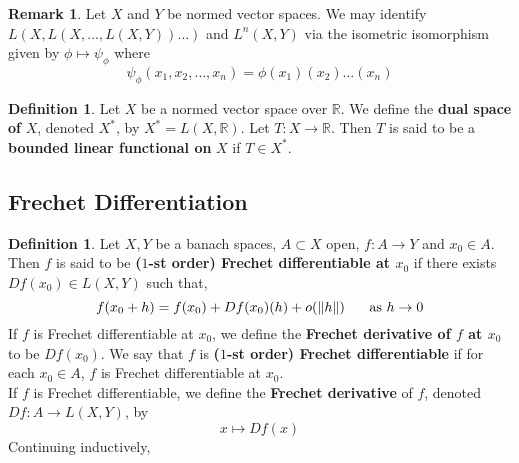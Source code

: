 \documentclass[notheorems]{beamer}
\theoremstyle{definition}
\newtheorem{defn}[definition]{Definition}
\theoremstyle{definition}
\newtheorem{rem}[definition]{Remark}
\newcommand{\R}{\mathbb{R}}
\begin{document}
	
	
	
	\begin{frame}
	
	\begin{rem}
	
	Let $X$ and $Y$ be normed vector spaces. We may identify $L(X, L(X, \dots, L(X, Y)) \dots)$ and $L^n(X, Y)$ via the isometric isomorphism given by $\phi \mapsto \psi_{\phi}$ where $$\psi_{\phi}(x_1, x_2, \dots, x_n) = \phi(x_1)(x_2) \dots (x_n)$$ 
	\end{rem}
	\pause

	\begin{defn}
	Let $X$ be a normed vector space over $\R$. We define the \textbf{dual space of} $X$, denoted $X^*$, by $X^* = L(X, \R)$. Let $T: X \rightarrow \R$. Then $T$ is said to be a \textbf{bounded linear functional on} $X$ if $T \in X^*$.
	\end{defn}
	
\end{frame}
























\subsection{Frechet Differentiation}
\begin{frame}
	
	

	\begin{defn}
	Let $X, Y$ be a banach spaces, $A \subset X$ open, $f:A \rightarrow Y$ and $x_0 \in A$. Then $f$ is said to be \textbf{\textbf{($1$-st order) Frechet differentiable} at $x_0$} if there exists $Df(x_0) \in L(X,Y)$ such that, $$f(x_0 + h) = f(x_0) + Df(x_0)(h) + o(\|h\| ) \hspace{.5cm} \text{ as } h \rightarrow 0$$  
	If $f$ is Frechet differentiable at $x_0$, we define the \textbf{Frechet derivative of $f$ at $x_0$} to be $Df(x_0)$.
	We say that $f$ is \textbf{($1$-st order) Frechet differentiable} if for each $x_0 \in A$, $f$ is Frechet differentiable at $x_0$. \\
	If $f$ is Frechet differentiable, we define the \textbf{Frechet derivative} of $f$, denoted $Df: A \rightarrow L(X,Y)$, by $$x \mapsto Df(x)$$
	Continuing inductively, 
	\end{defn}

\end{frame}
\end{document}
